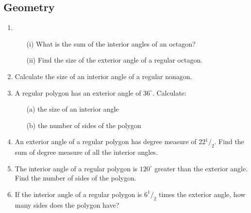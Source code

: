 \subsection{Geometry}
	
\begin{enumerate}
		\item 
		\begin{itemize}
		\item[(i)] What is the sum of the interior angles of an octagon?
		\item[(ii)] Find the size of the exterior angle of a regular octagon.
		\end{itemize}
		
	\item Calculate the size of an interior angle of a regular nonagon.
	
	\item A regular polygon has an exterior angle of $36^\circ$. Calculate:
		\begin{itemize}
		\item[(a)] the size of an interior angle
		\item[(b)] the number of sides of the polygon
		\end{itemize}
	
	\item An exterior angle of a regular polygon has degree measure of 22$^1/_2$. Find the sum of degree measure of all the interior angles.
	
	\item The interior angle of a regular polygon is $120^\circ$ greater than the exterior angle. Find the number of sides of the polygon.
	
	\item If the interior angle of a regular polygon is $6^1/_2$ times the exterior angle, how many sides does the polygon have?


\end{enumerate}
